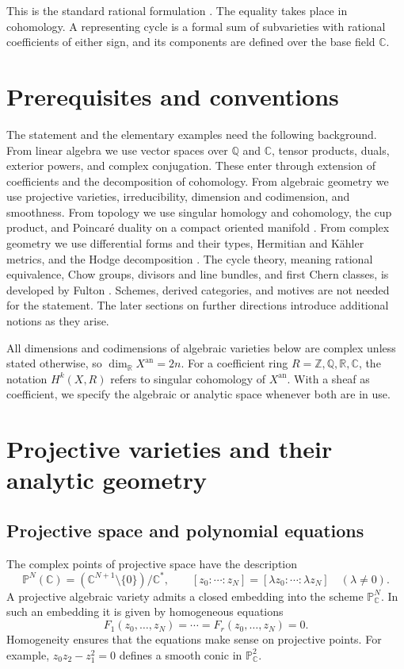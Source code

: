 \documentclass[11pt,reqno]{amsart}
\theoremstyle{definition}
\theoremstyle{remark}
\numberwithin{equation}{section}
\newcommand{\C}{\mathbb{C}}
\newcommand{\R}{\mathbb{R}}
\newcommand{\Z}{\mathbb{Z}}
\newcommand{\Q}{\mathbb{Q}}
\newcommand{\PP}{\mathbb{P}}
\newcommand{\an}{\mathrm{an}}
\begin{document}
This is the standard rational formulation \cite{delignecmi2006,cmihodge}. The equality
takes place in cohomology. A representing cycle is a formal sum of
subvarieties with rational coefficients of either sign, and its components
are defined over the base field $\C$.

\section{Prerequisites and conventions}\label{sec:prereq}

The statement and the elementary examples need the following background.
From linear algebra we use vector spaces over $\Q$ and $\C$, tensor
products, duals, exterior powers, and complex conjugation. These enter
through extension of coefficients and the decomposition of cohomology. From
algebraic geometry we use projective varieties, irreducibility, dimension
and codimension, and smoothness. From topology we use singular homology and
cohomology, the cup product, and Poincar\'e duality on a compact oriented
manifold \cite{hatcher2002}. From complex geometry we use differential forms and
their types, Hermitian and K\"ahler metrics, and the Hodge decomposition
\cite{griffithsharris1978,voisin2002hodge,voisin2003hodge2}. The cycle theory, meaning rational equivalence,
Chow groups, divisors and line bundles, and first Chern classes, is
developed by Fulton \cite{fulton1998}. Schemes, derived categories, and motives
are not needed for the statement. The later sections on further directions
introduce additional notions as they arise.

All dimensions and codimensions of algebraic varieties below are complex
unless stated otherwise, so $\dim_{\R}X^{\an}=2n$. For a coefficient ring
$R=\Z,\Q,\R,\C$, the notation $H^k(X,R)$ refers to singular cohomology
of $X^{\an}$. With a sheaf as coefficient, we specify the algebraic or
analytic space whenever both are in use.

\section{Projective varieties and their analytic geometry}

\subsection{Projective space and polynomial equations}

The complex points of projective space have the description
\[
 \PP^N(\C)=(\C^{N+1}\setminus\{0\})/\C^*,
 \qquad
 [z_0:\cdots:z_N]=[\lambda z_0:\cdots:\lambda z_N]
 \quad(\lambda\neq0).
\]
A projective algebraic variety admits a closed embedding into the scheme
$\PP^N_{\C}$. In such an embedding it is given by homogeneous equations
\[
 F_1(z_0,\ldots,z_N)=\cdots=F_r(z_0,\ldots,z_N)=0.
\]
Homogeneity ensures that the equations make sense on projective points.
For example, $z_0z_2-z_1^2=0$ defines a smooth conic in $\PP^2_{\C}$.
\end{document}
